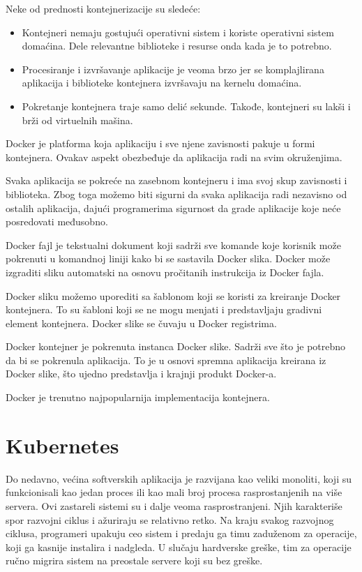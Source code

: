Neke od prednosti kontejnerizacije su sledeće:
\begin{itemize}
    \item Kontejneri nemaju gostujući operativni sistem i koriste operativni sistem domaćina. 
    Dele relevantne biblioteke i resurse onda kada je to potrebno.
    \item Procesiranje i izvršavanje aplikacije je veoma brzo jer se komplajlirana aplikacija 
    i biblioteke kontejnera izvršavaju na kernelu domaćina.
    \item Pokretanje kontejnera traje samo delić sekunde. Takođe, kontejneri su lakši i brži 
    od virtuelnih mašina.
\end{itemize}

Docker je platforma koja aplikaciju i sve njene zavisnosti pakuje u formi kontejnera. 
Ovakav aspekt obezbeđuje da aplikacija radi na svim okruženjima.

Svaka aplikacija se pokreće na zasebnom kontejneru i ima svoj skup zavisnosti i biblioteka. 
Zbog toga možemo biti sigurni da svaka aplikacija radi nezavisno od ostalih aplikacija, 
dajući programerima sigurnost da grade aplikacije koje neće posredovati međusobno.

Docker fajl je tekstualni dokument koji sadrži sve komande koje korisnik može pokrenuti 
u komandnoj liniji kako bi se sastavila Docker slika. Docker može izgraditi sliku automatski 
na osnovu pročitanih instrukcija iz Docker fajla.

Docker sliku možemo uporediti sa šablonom koji se koristi za kreiranje Docker kontejnera. 
To su šabloni koji se ne mogu menjati i predstavljaju gradivni element kontejnera.
Docker slike se čuvaju u Docker registrima. 

Docker kontejner je pokrenuta instanca Docker slike. Sadrži sve što je potrebno da bi se 
pokrenula aplikacija. To je u osnovi spremna aplikacija kreirana iz Docker slike, 
što ujedno predstavlja i krajnji produkt Docker-a.~\cite{docker}

Docker je trenutno najpopularnija implementacija kontejnera.

\section{Kubernetes}\label{sec:kubernetes}

Do nedavno, većina softverskih aplikacija je razvijana kao veliki monoliti, koji su funkcionisali kao jedan proces 
ili kao mali broj procesa rasprostanjenih na više servera. Ovi zastareli sistemi su i dalje veoma rasprostranjeni. 
Njih karakteriše spor razvojni ciklus i ažuriraju se relativno retko. Na kraju svakog razvojnog ciklusa, programeri
upakuju ceo sistem i predaju ga timu zaduženom za operacije, koji ga kasnije instalira i nadgleda. U slučaju hardverske
greške, tim za operacije ručno migrira sistem na preostale servere koji su bez greške.

